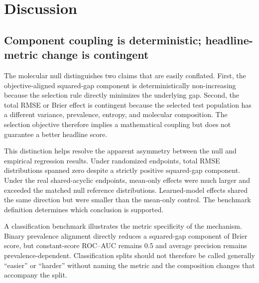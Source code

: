 \section{Discussion}

\subsection{Component coupling is deterministic; headline-metric change is contingent}

The molecular null distinguishes two claims that are easily conflated. First, the objective-aligned squared-gap component is deterministically non-increasing because the selection rule directly minimizes the underlying gap. Second, the total RMSE or Brier effect is contingent because the selected test population has a different variance, prevalence, entropy, and molecular composition. The selection objective therefore implies a mathematical coupling but does not guarantee a better headline score.

This distinction helps resolve the apparent asymmetry between the null and empirical regression results. Under randomized endpoints, total RMSE distributions spanned zero despite a strictly positive squared-gap component. Under the real shared-acyclic endpoints, mean-only effects were much larger and exceeded the matched null reference distributions. Learned-model effects shared the same direction but were smaller than the mean-only control. The benchmark definition determines which conclusion is supported.

A classification benchmark illustrates the metric specificity of the mechanism. Binary prevalence alignment directly reduces a squared-gap component of Brier score, but constant-score ROC--AUC remains 0.5 and average precision remains prevalence-dependent. Classification splits should not therefore be called generally ``easier'' or ``harder'' without naming the metric and the composition changes that accompany the split.

